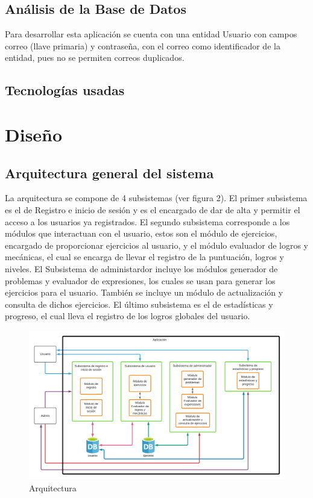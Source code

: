 \documentclass{article}
\begin{document}
\subsection{Análisis de la Base de Datos}%
Para desarrollar esta aplicación se cuenta con una entidad Usuario con campos correo (llave primaria) y contraseña, con el correo como identificador de la entidad, pues no se permiten correos duplicados.
\subsection{Tecnologías usadas}
\pagebreak
\section{Diseño}
\subsection{Arquitectura general del sistema}%
La arquitectura se compone de 4 subsistemas (ver figura 2).  El primer subsistema es el de Registro e inicio de sesión y es el encargado de dar de alta y permitir el acceso a los usuarios ya registrados. El segundo subsistema corresponde a los módulos que interactuan con el usuario, estos son el módulo de ejercicios, encargado de proporcionar ejercicios al usuario, y el módulo evaluador de logros y mecánicas, el cual se encarga de llevar el registro de la puntuación, logros y niveles. El Subsistema de administardor incluye los módulos generador de problemas y evaluador de expresiones, los cuales se usan para generar los ejercicios para el usuario. También se incluye un módulo de actualización y consulta de dichos ejercicios. El último subsistema es el de estadísticas y progreso, el cual lleva el registro de los logros globales del usuario.  
\begin{figure}[H]
    \centering
    \includegraphics[scale=0.65]{imgs/Arquitectura}
    \caption{Arquitectura}
\end{figure}
\end{document}
